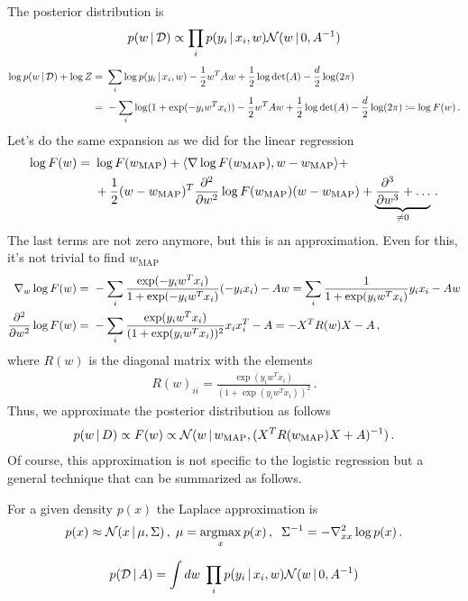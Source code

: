 The posterior distribution is
\begin{align}
    p(w\,|\, \mathcal{D}) \propto \prod_i p(y_i\,|\, x_i,w) \mathcal{N}(w\,|\, 0, A^{-1})
\end{align}
\begin{align}
    \log p(w\,|\, \mathcal{D}) + \log Z =~& \sum_i \log p(y_i \,|\, x_i, w) - \frac{1}{2}w^TAw + \frac{1}{2} \log \det (A) - \frac{d}{2}\log (2\pi) \\
    =~& -\sum_i \log (1+\exp(-y_iw^Tx_i)) - \frac{1}{2}w^TAw + \frac{1}{2} \log \det (A) - \frac{d}{2}\log (2\pi) \coloneqq \log F(w)\,.
\end{align}
Let's do the same expansion as we did for the linear regression
\begin{align}
    \log F(w) =~& \log F(w_{\text{MAP}}) + \inner{\nabla \log F(w_{\text{MAP}})}{w-w_{\text{MAP}}} + \\
    ~&+\frac{1}{2} (w - w_{\text{MAP}})^T \deriv{^2}{w^2} \log F(w_{\text{MAP}}) (w - w_{\text{MAP}}) + \underbrace{\deriv{^3}{w^3} + \ldots}_{\neq 0}\,.
\end{align}
The last terms are not zero anymore, but this is an approximation.
Even for this, it's not trivial to find $w_{\text{MAP}}$
\begin{align}
    \nabla_w \log F(w) =~& -\sum_i \frac{\exp(-y_iw^Tx_i)}{1+\exp(-y_iw^Tx_i)}(-y_ix_i) - Aw = \sum_i \frac{1}{1+\exp(y_iw^Tx_i)}y_ix_i - Aw\\
    \frac{\partial ^2}{\partial w^2} \log F(w) =~& -\sum_i \frac{\exp(y_iw^Tx_i)}{(1+\exp(y_iw^Tx_i))^2}x_i x_i^T - A = -X^TR(w)X - A\,,
\end{align}
where $R(w)$ is the diagonal matrix with the elements
\begin{align}
    R(w)_{ii} = \frac{\exp(y_iw^Tx_i)}{(1+\exp(y_iw^Tx_i))^2}\,.
\end{align}
Thus, we approximate the posterior distribution as follows 
\begin{align}
    p(w\,|\, D) \propto F(w) \propto \mathcal{N}(w\,|\, w_{\text{MAP}}, (X^TR(w_{\text{MAP}})X + A)^{-1})\,.
\end{align}
Of course, this approximation is not specific to the logistic regression but a general technique that can be summarized as follows.
\begin{mybox}
\begin{definition}
\label{def:laplace}
    For a given density $p(x)$ the Laplace approximation is 
    \begin{align}
        p(x) \approx \mathcal{N}(x\,|\, \mu, \Sigma)\,,\; \mu = \operatorname*{argmax}_x p(x)\,,\;\; \Sigma^{-1} = -\nabla^2_{xx}\log p(x)\,.
    \end{align}
\end{definition}    
\end{mybox}


\begin{align}
    p(\mathcal{D}\,|\, A) = \int dw\; \prod_i p(y_i\,|\, x_i,w) \mathcal{N}(w\,|\, 0, A^{-1})
\end{align}
